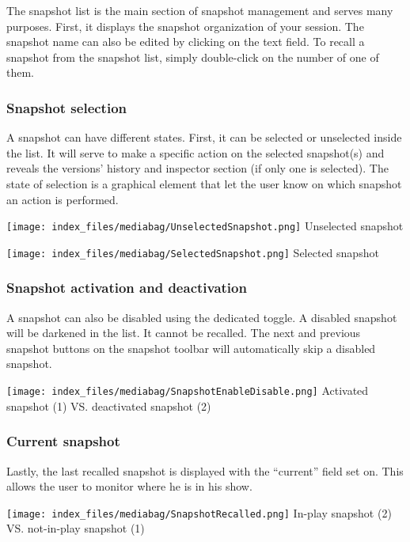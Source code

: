 \documentclass[
  letterpaper,
  DIV=11,
  numbers=noendperiod]{scrreport}
\begin{document}
The snapshot list is the main section of snapshot management and serves
many purposes. First, it displays the snapshot organization of your
session. The snapshot name can also be edited by clicking on the text
field. To recall a snapshot from the snapshot list, simply double-click
on the number of one of them.

\hypertarget{snapshot-selection}{%
\subsubsection{Snapshot selection}\label{snapshot-selection}}

A snapshot can have different states. First, it can be selected or
unselected inside the list. It will serve to make a specific action on
the selected snapshot(s) and reveals the versions' history and inspector
section (if only one is selected). The state of selection is a graphical
element that let the user know on which snapshot an action is performed.

\texttt{[image: index\_files/mediabag/UnselectedSnapshot.png]} Unselected
snapshot

\texttt{[image: index\_files/mediabag/SelectedSnapshot.png]} Selected
snapshot

\hypertarget{snapshot-activation-and-deactivation}{%
\subsubsection{Snapshot activation and
deactivation}\label{snapshot-activation-and-deactivation}}

A snapshot can also be disabled using the dedicated toggle. A disabled
snapshot will be darkened in the list. It cannot be recalled. The next
and previous snapshot buttons on the snapshot toolbar will automatically
skip a disabled snapshot.

\texttt{[image: index\_files/mediabag/SnapshotEnableDisable.png]}
Activated snapshot (1) VS. deactivated snapshot (2)

\hypertarget{current-snapshot}{%
\subsubsection{Current snapshot}\label{current-snapshot}}

Lastly, the last recalled snapshot is displayed with the ``current''
field set on. This allows the user to monitor where he is in his show.

\texttt{[image: index\_files/mediabag/SnapshotRecalled.png]} In-play
snapshot (2) VS. not-in-play snapshot (1)
\end{document}
